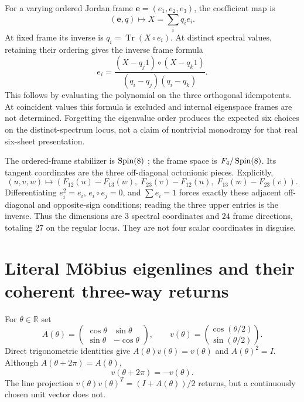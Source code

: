 \documentclass[11pt]{article}
\theoremstyle{definition}\newtheorem{definition}[theorem]{Definition}
\newcommand{\R}{\mathbb R}\newcommand{\Q}{\mathbb Q}\newcommand{\Z}{\mathbb Z}
\DeclareMathOperator{\Tr}{Tr}\DeclareMathOperator{\Rea}{Re}
\begin{document}
For a varying ordered Jordan frame $\mathbf e=(e_1,e_2,e_3)$, the coefficient map is
\[
 (\mathbf e,q)\longmapsto X=\sum_iq_ie_i.
\]
At fixed frame its inverse is $q_i=\Tr(X\circ e_i)$. At distinct spectral values, retaining their ordering gives the inverse frame formula
\begin{equation}\label{eq:projectors}
 e_i=\frac{(X-q_j1)\circ(X-q_k1)}{(q_i-q_j)(q_i-q_k)}.
\end{equation}
This follows by evaluating the polynomial on the three orthogonal idempotents. At coincident values this formula is excluded and internal eigenspace frames are not determined. Forgetting the eigenvalue order produces the expected six choices on the distinct-spectrum locus, not a claim of nontrivial monodromy for that real six-sheet presentation.

The ordered-frame stabilizer is $\operatorname{Spin}(8)$ \cite[Theorem~2.7.1, printed p.~52]{yokota}; the frame space is $F_4/\operatorname{Spin}(8)$. Its tangent coordinates are the three off-diagonal octonionic pieces. Explicitly,
\[
 (u,v,w)\longmapsto
 \left(F_{12}(u)-F_{13}(w),\;
 F_{23}(v)-F_{12}(u),\;
 F_{13}(w)-F_{23}(v)\right).
\]
Differentiating $e_i^2=e_i$, $e_i\circ e_j=0$, and $\sum e_i=1$ forces exactly these adjacent off-diagonal and opposite-sign conditions; reading the three upper entries is the inverse. Thus the dimensions are $3$ spectral coordinates and $24$ frame directions, totaling $27$ on the regular locus. They are not four scalar coordinates in disguise.

\section{Literal M\"obius eigenlines and their coherent three-way returns}
For $\theta\in\R$ set
\[
 A(\theta)=\begin{pmatrix}\cos\theta&\sin\theta\\\sin\theta&-\cos\theta\end{pmatrix},\qquad
 v(\theta)=\binom{\cos(\theta/2)}{\sin(\theta/2)}.
\]
Direct trigonometric identities give $A(\theta)v(\theta)=v(\theta)$ and $A(\theta)^2=I$. Although $A(\theta+2\pi)=A(\theta)$,
\begin{equation}\label{eq:mobius}
 v(\theta+2\pi)=-v(\theta).
\end{equation}
The line projection $v(\theta)v(\theta)^T=(I+A(\theta))/2$ returns, but a continuously chosen unit vector does not.
\end{document}
